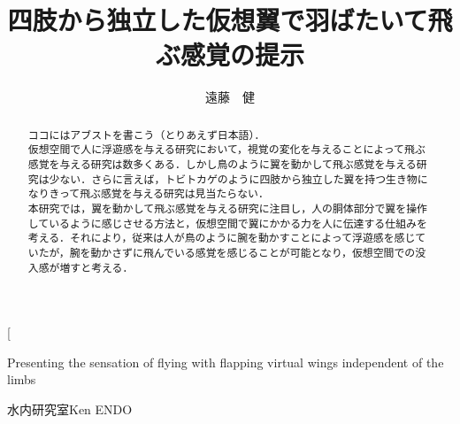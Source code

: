 
\usepackage{jtygm}
\usepackage{ikuo}
\newcommand{\FIGDIR}{./fig}	%
\setlength{\headheight}{15pt}

\twocolumn[%
\title{四肢から独立した仮想翼で羽ばたいて飛ぶ感覚の提示}{Presenting the sensation of flying with flapping virtual wings independent of the limbs}
\author{遠藤　健}{水内研究室}{Ken ENDO}

\begin{abstract}
ココにはアブストを書こう（とりあえず日本語）．\\
仮想空間で人に浮遊感を与える研究において，視覚の変化を与えることによって飛ぶ感覚を与える研究は数多くある．しかし鳥のように翼を動かして飛ぶ感覚を与える研究は少ない．さらに言えば，トビトカゲのように四肢から独立した翼を持つ生き物になりきって飛ぶ感覚を与える研究は見当たらない．\\
    
本研究では，翼を動かして飛ぶ感覚を与える研究に注目し，人の胴体部分で翼を操作しているように感じさせる方法と，仮想空間で翼にかかる力を人に伝達する仕組みを考える．それにより，従来は人が鳥のように腕を動かすことによって浮遊感を感じていたが，腕を動かさずに飛んでいる感覚を感じることが可能となり，仮想空間での没入感が増すと考える．


\end{abstract}

